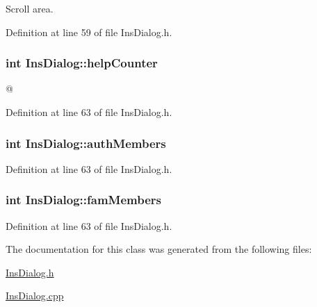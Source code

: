 Scroll area. 



Definition at line 59 of file Ins\+Dialog.\+h.

\hypertarget{class_ins_dialog_aa67a0256243ba4ca9bb6623610ad3f3a}{
\subsubsection[{help\+Counter}]{\setlength{\rightskip}{0pt plus 5cm}int Ins\+Dialog\+::help\+Counter\hspace{0.3cm}{\ttfamily [private]}}}\label{class_ins_dialog_aa67a0256243ba4ca9bb6623610ad3f3a}
@ 

Definition at line 63 of file Ins\+Dialog.\+h.

\hypertarget{class_ins_dialog_a665468f228a04cf077de009d22736f21}{
\subsubsection[{auth\+Members}]{\setlength{\rightskip}{0pt plus 5cm}int Ins\+Dialog\+::auth\+Members\hspace{0.3cm}{\ttfamily [private]}}}\label{class_ins_dialog_a665468f228a04cf077de009d22736f21}


Definition at line 63 of file Ins\+Dialog.\+h.

\hypertarget{class_ins_dialog_ac1fbb6dd4e8c3828826a98c3946935a3}{
\subsubsection[{fam\+Members}]{\setlength{\rightskip}{0pt plus 5cm}int Ins\+Dialog\+::fam\+Members\hspace{0.3cm}{\ttfamily [private]}}}\label{class_ins_dialog_ac1fbb6dd4e8c3828826a98c3946935a3}


Definition at line 63 of file Ins\+Dialog.\+h.



The documentation for this class was generated from the following files\+:\begin{DoxyCompactItemize}
\item 
\hyperlink{_ins_dialog_8h}{Ins\+Dialog.\+h}\item 
\hyperlink{_ins_dialog_8cpp}{Ins\+Dialog.\+cpp}\end{DoxyCompactItemize}
